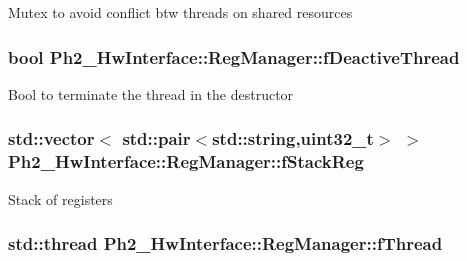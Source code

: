 Mutex to avoid conflict btw threads on shared resources \hypertarget{class_ph2___hw_interface_1_1_reg_manager_ae337041a55b10db74bbd8e171424807a}{
\subsubsection[{f\-Deactive\-Thread}]{\setlength{\rightskip}{0pt plus 5cm}bool Ph2\-\_\-\-Hw\-Interface\-::\-Reg\-Manager\-::f\-Deactive\-Thread\hspace{0.3cm}{\ttfamily [protected]}}}\label{class_ph2___hw_interface_1_1_reg_manager_ae337041a55b10db74bbd8e171424807a}
Bool to terminate the thread in the destructor \hypertarget{class_ph2___hw_interface_1_1_reg_manager_a382c1c2373fde66d98a44e4aa0208e81}{
\subsubsection[{f\-Stack\-Reg}]{\setlength{\rightskip}{0pt plus 5cm}std\-::vector$<$ std\-::pair$<$std\-::string,uint32\-\_\-t$>$ $>$ Ph2\-\_\-\-Hw\-Interface\-::\-Reg\-Manager\-::f\-Stack\-Reg\hspace{0.3cm}{\ttfamily [protected]}}}\label{class_ph2___hw_interface_1_1_reg_manager_a382c1c2373fde66d98a44e4aa0208e81}
Stack of registers \hypertarget{class_ph2___hw_interface_1_1_reg_manager_a3aa2f1c4769f122a2e902f2d70865b30}{
\subsubsection[{f\-Thread}]{\setlength{\rightskip}{0pt plus 5cm}std\-::thread Ph2\-\_\-\-Hw\-Interface\-::\-Reg\-Manager\-::f\-Thread\hspace{0.3cm}{\ttfamily [protected]}}}\label{class_ph2___hw_interface_1_1_reg_manager_a3aa2f1c4769f122a2e902f2d70865b30}

